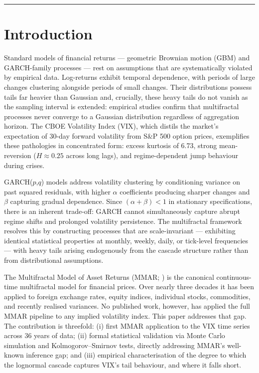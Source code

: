 \documentclass[12pt,a4paper]{article}
\begin{document}
\bigskip
\hrule
\bigskip

\section{Introduction}

Standard models of financial returns --- geometric Brownian motion (GBM)
and GARCH-family processes --- rest on assumptions that are
systematically violated by empirical data. Log-returns exhibit temporal
dependence, with periods of large changes clustering alongside periods
of small changes. Their distributions possess tails far heavier than
Gaussian and, crucially, these heavy tails do not vanish as the sampling
interval is extended: empirical studies confirm that multifractal
processes never converge to a Gaussian distribution regardless of
aggregation horizon. The CBOE Volatility Index (VIX), which distils
the market's expectation of 30-day forward volatility from S\&P 500
option prices, exemplifies these pathologies in concentrated form:
excess kurtosis of 6.73, strong mean-reversion ($H \approx 0.25$
across long lags), and regime-dependent jump behaviour during crises.

GARCH($p$,$q$) models \citep{bollerslev1986} address volatility
clustering by conditioning variance on past squared residuals, with
higher $\alpha$ coefficients producing sharper changes and $\beta$
capturing gradual dependence. Since $(\alpha + \beta) < 1$ in
stationary specifications, there is an inherent trade-off: GARCH
cannot simultaneously capture abrupt regime shifts and prolonged
volatility persistence. The multifractal framework resolves this by
constructing processes that are scale-invariant --- exhibiting identical
statistical properties at monthly, weekly, daily, or tick-level
frequencies --- with heavy tails arising endogenously from the cascade
structure rather than from distributional assumptions.

The Multifractal Model of Asset Returns (MMAR;
\citealt{mandelbrot1997}) is the canonical continuous-time multifractal
model for financial prices. Over nearly three decades it has been
applied to foreign exchange rates, equity indices, individual stocks,
commodities, and recently realised variances. No published work,
however, has applied the full MMAR pipeline to any implied volatility
index. This paper addresses that gap. The contribution is threefold:
(i) first MMAR application to the VIX time series across 36 years of
data; (ii) formal statistical validation via Monte Carlo simulation and
Kolmogorov--Smirnov tests, directly addressing MMAR's well-known
inference gap; and (iii) empirical characterisation of the degree to
which the lognormal cascade captures VIX's tail behaviour, and where
it falls short.
\end{document}
